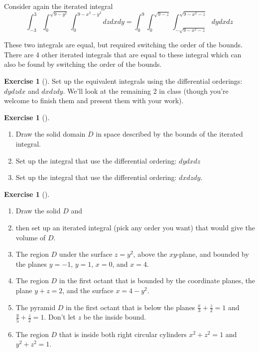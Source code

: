 \documentclass[10pt,]{book}
\theoremstyle{plain}
\theoremstyle{definition}
\theoremstyle{definition}
\theoremstyle{definition}
\theoremstyle{definition}
\newtheorem{exploration}[project]{Exercise}
\theoremstyle{definition}
\numberwithin{equation}{section}
\newcommand{\ds}{\displaystyle}
\begin{document}
%
\par
Consider again the iterated integral%
\begin{equation*}
\ds \int_{-3}^3 \int_0^{\sqrt{9-y^2}}\int_0^{9-x^2-y^2} dzdxdy = \int_0^9\int_0^{\sqrt{9-z}}\int_{-\sqrt{9-x^2-z}}^{\sqrt{9-x^2-z}} dydxdz
\end{equation*}
%
\par
These two integrals are equal, but required switching the order of the bounds. There are 4 other iterated integrals that are equal to these integral which can also be found by switching the order of the bounds.%
\begin{exploration}[]\label{exploration-297}
Set up the equivalent integrals using the differential orderings: \(dydzdx\) and \(dxdzdy\). We'll look at the remaining 2 in class (though you're welcome to finish them and present them with your work).%
\end{exploration}
\begin{exploration}[]\label{exploration-298}
\leavevmode%
\begin{enumerate}[font=\bfseries,label=(\alph*),ref=\alph*]
\item\label{task-811} Draw the solid domain \(D\) in space described by the bounds of the iterated integral.%
\item\label{task-812} Set up the integral that use the differential ordering: \(dydxdz\)%
\item\label{task-813} Set up the integral that use the differential ordering: \(dxdzdy\).%
\end{enumerate}
\end{exploration}
\begin{exploration}[]\label{exploration-299}
\leavevmode%
\begin{enumerate}[font=\bfseries,label=(\alph*),ref=\alph*]
\item\label{task-814} Draw the solid \(D\) and%
\item\label{task-815} then set up an iterated integral (pick any order you want) that would give the volume of \(D\).%
\item\label{task-816} The region \(D\) under the surface \(z=y^2\), above the \(xy\)-plane, and bounded by the planes \(y=-1\), \(y=1\), \(x=0\), and \(x=4\).%
\item\label{task-817} The region \(D\) in the first octant that is bounded by the coordinate planes, the plane \(y+z=2\), and the surface \(x=4-y^2\).%
\item\label{task-818} The pyramid \(D\) in the first octant that is below the planes \(\ds\frac{x}{3}+\frac{z}{2}=1\) and \(\ds\frac{y}{5}+\frac{z}{2}=1\). Don't let \(z\) be the inside bound.%
%
\item\label{task-819} The region \(D\) that is inside both right circular cylinders \(x^2+z^2=1\) and \(y^2+z^2=1\).%
\end{enumerate}
\end{exploration}
\end{document}
